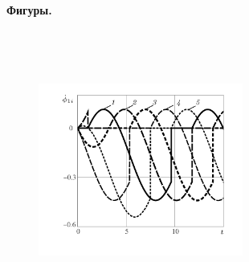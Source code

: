 % 

% 

% 

% 


\newpage

{\bf Фигуры.}

\begin{figure}[H]
    \hspace{-0.6cm}
    \quad
        \caption{\ }
        \label{fig:wheel}
\end{figure}

\begin{figure}[H]
    \centering
    \quad
    \caption{\ }
    \label{fig:overlap_and_change}
\end{figure}



\begin{figure}[H]
  \hspace{2.73cm}\includegraphics[width=0.6\textwidth]{pic/figure5_1.pdf}
  \caption{\ }
  \label{fig:selfrot}
\end{figure}

